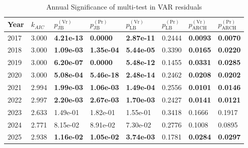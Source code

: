 \documentclass{elsarticle}
\begin{document}
\begin{table}[H]
  \centering
  \caption{Annual Significance of multi-test in VAR residuals}
  \label{tab:var_sig}
  \begin{tabular}{llllllll}
    \hline\noalign{\smallskip}
    \textbf{Year} & $k_{AIC}$ & $p^{(\mathrm{Vr})}_{\mathrm{JB}}$ & $p^{(\mathrm{Pr})}_{\mathrm{JB}}$ & $p^{(\mathrm{Vr})}_{\mathrm{LB}}$ & $p^{(\mathrm{Pr})}_{\mathrm{LB}}$ & $p^{(\mathrm{Vr})}_{\mathrm{ARCH}}$ & $p^{(\mathrm{Pr})}_{\mathrm{ARCH}}$ \\
    \hline\noalign{\smallskip}
    2017 & 3.000 & \textbf{4.21e-13} & \textbf{0.0000} & \textbf{2.87e-11} & 0.2444 & \textbf{0.0093} & \textbf{0.0070} \\
    2018 & 3.000 & \textbf{1.09e-03} & \textbf{1.35e-04} & \textbf{5.44e-05} & 0.3390 & \textbf{0.0165} & \textbf{0.0220} \\
    2019 & 3.000 & \textbf{6.20e-07} & \textbf{0.0000} & \textbf{5.48e-12} & 0.1455 & \textbf{0.0331} & \textbf{0.0285} \\
    2020 & 3.000 & \textbf{5.08e-04} & \textbf{5.46e-18} & \textbf{2.48e-14} & 0.2462 & \textbf{0.0208} & \textbf{0.0202} \\
    2021 & 2.994 & \textbf{1.99e-03} & \textbf{1.06e-03} & \textbf{1.49e-04} & 0.2556 & \textbf{0.0101} & \textbf{0.0146} \\
    2022 & 2.997 & \textbf{2.20e-03} & \textbf{2.67e-03} & \textbf{1.70e-03} & 0.2427 & \textbf{0.0141} & \textbf{0.0121} \\
    2023 & 2.633 & 1.49e-01 & 1.82e-01 & 1.55e-01 & 0.3418 & 0.1666 & 0.1917 \\
    2024 & 2.771 & 8.15e-02 & 8.91e-02 & 7.30e-02 & 0.2776 & 0.1008 & 0.0895 \\
    2025 & 2.938 & \textbf{1.16e-02} & \textbf{1.05e-02} & \textbf{3.74e-03} & 0.1781 & \textbf{0.0284} & \textbf{0.0297} \\
    \hline
  \end{tabular}
\end{table}
\end{document}
